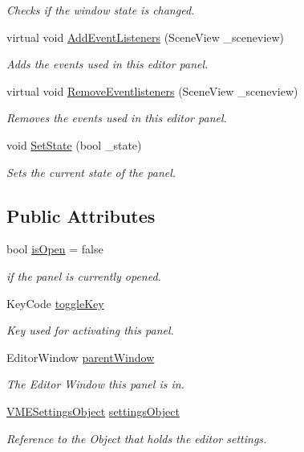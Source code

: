 \begin{DoxyCompactItemize}
\begin{DoxyCompactList}\small\item\em Checks if the window state is changed. \end{DoxyCompactList}\item 
virtual void \hyperlink{class_base_editor_panel_ac35cb29ff5d4e06dde071f7e1b16629d}{Add\+Event\+Listeners} (Scene\+View \+\_\+sceneview)
\begin{DoxyCompactList}\small\item\em Adds the events used in this editor panel. \end{DoxyCompactList}\item 
virtual void \hyperlink{class_base_editor_panel_a18cb314bcfdc5b56bfc0dcd316023bb6}{Remove\+Eventlisteners} (Scene\+View \+\_\+sceneview)
\begin{DoxyCompactList}\small\item\em Removes the events used in this editor panel. \end{DoxyCompactList}\item 
void \hyperlink{class_base_editor_panel_a6aa206595fa39c904d248dc6bd9fb8b9}{Set\+State} (bool \+\_\+state)
\begin{DoxyCompactList}\small\item\em Sets the current state of the panel. \end{DoxyCompactList}\end{DoxyCompactItemize}
\subsection*{Public Attributes}
\begin{DoxyCompactItemize}
\item 
bool \hyperlink{class_base_editor_panel_ab42b67df97ab6bb60248f925668e4716}{is\+Open} = false
\begin{DoxyCompactList}\small\item\em if the panel is currently opened. \end{DoxyCompactList}\item 
Key\+Code \hyperlink{class_base_editor_panel_af34e3c07554a0c56901e6c9c6fe4d33c}{toggle\+Key}
\begin{DoxyCompactList}\small\item\em Key used for activating this panel. \end{DoxyCompactList}\item 
Editor\+Window \hyperlink{class_base_editor_panel_a9b10134d16fca13b5c9b400ccbd06543}{parent\+Window}
\begin{DoxyCompactList}\small\item\em The Editor Window this panel is in. \end{DoxyCompactList}\item 
\hyperlink{class_v_m_e_settings_object}{V\+M\+E\+Settings\+Object} \hyperlink{class_base_editor_panel_a4b4881caa31e3604aaaa5f6914405e8a}{settings\+Object}
\begin{DoxyCompactList}\small\item\em Reference to the Object that holds the editor settings. \end{DoxyCompactList}\end{DoxyCompactItemize}


